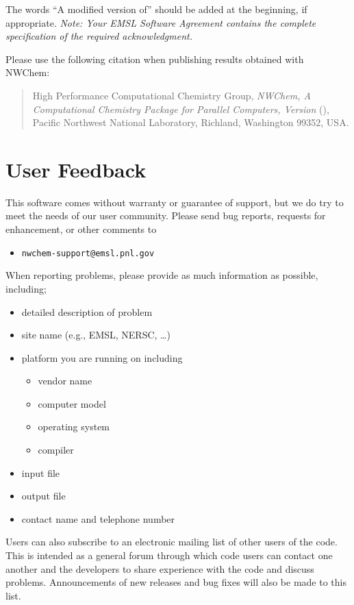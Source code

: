 The words ``A modified version of'' should be added at the beginning,
if appropriate.  {\em Note: Your EMSL Software Agreement contains the
complete specification of the required acknowledgment.}

Please use the following citation when publishing results obtained
with NWChem:
\begin{quote}
  High Performance Computational Chemistry Group, {\em NWChem, A
   Computational Chemistry Package for Parallel Computers, Version
    \nwchemversion{}} (\nwchemyear), Pacific Northwest National
  Laboratory, Richland, Washington 99352, USA.
\end{quote}

\section{User Feedback}

This software comes without warranty or guarantee of support,
but we do try to meet the needs of our user community.  Please send bug
reports, requests for enhancement, or other comments to

\begin{itemize}
\item {\tt nwchem-support@emsl.pnl.gov}
\end{itemize}

When reporting problems, please provide as much information as possible, 
including;

\begin{itemize}
\item detailed description of problem
\item site name (e.g., EMSL, NERSC, \ldots)
\item platform you are running on including
\begin{itemize}
\item vendor name
\item computer model
\item operating system
\item compiler
\end{itemize}
\item input file
\item output file
\item contact name and telephone number
\end{itemize}

Users can also subscribe to an electronic mailing list of other users
of the code.  This is intended as a general forum through which code
users can contact one another and the developers to share experience
with the code and discuss problems.  Announcements of new releases and
bug fixes will also be made to this list. 

